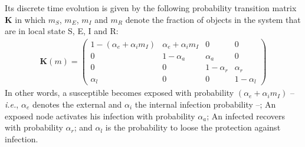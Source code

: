 \documentclass{sig-alternate-per}
\newcommand{\vr}[1]{\mathbf{#1}}
\newcommand{\n}[1]{m_{\mathit{#1}}}
\begin{document}
Its discrete time evolution is given by the following probability
transition matrix $\vr{K}$ in which $\n{S}$, $\n{E}$, $\n{I}$ and
$\n{R}$ denote the fraction of objects in the system that are in local
state S, E, I and R:
\begin{align*}
  \vr{K}(m)
  = \left(
  \begin{array}{cccc}
    1 - (\alpha_e + \alpha_i\n{I}) & \alpha_e + \alpha_i \n{I} & 0 & 0  \\
    0 & 1- \alpha_a & \alpha_a & 0 \\
    0 & 0 & 1 - \alpha_r & \alpha_r \\
    \alpha_l & 0 & 0 & 1 - \alpha_l 
  \end{array}
  \right)
\end{align*}
In other words, a susceptible becomes exposed with probability
$(\alpha_e+\alpha_i m_I)$ -- \emph{i.e.}, $\alpha_e$ denotes the
external and $\alpha_i$ the internal infection probability --; An
exposed node activates his infection with probability $\alpha_a$; An
infected recovers with probability $\alpha_r$; and $\alpha_l$ is the
probability to loose the protection against infection.
\end{document}
